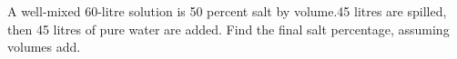 A well-mixed 60-litre solution is 50 percent salt by volume.45 litres are spilled, then 45 litres of pure water are added. Find the final salt percentage, assuming volumes add.
